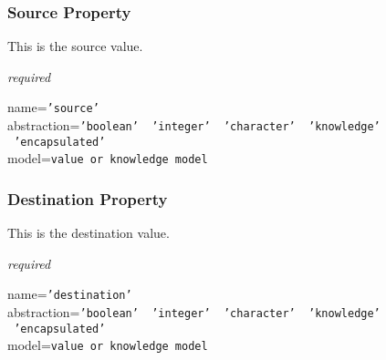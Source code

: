 \subsubsection{Source Property}

This is the source value.

\emph{required}

name=\texttt{'source'}\\
abstraction=\texttt{'boolean' \vline\ 'integer' \vline\ 'character' \vline\ 'knowledge' \vline\ 'encapsulated'}\\
model=\texttt{value or knowledge model}

\subsubsection{Destination Property}

This is the destination value.

\emph{required}

name=\texttt{'destination'}\\
abstraction=\texttt{'boolean' \vline\ 'integer' \vline\ 'character' \vline\ 'knowledge' \vline\ 'encapsulated'}\\
model=\texttt{value or knowledge model}
